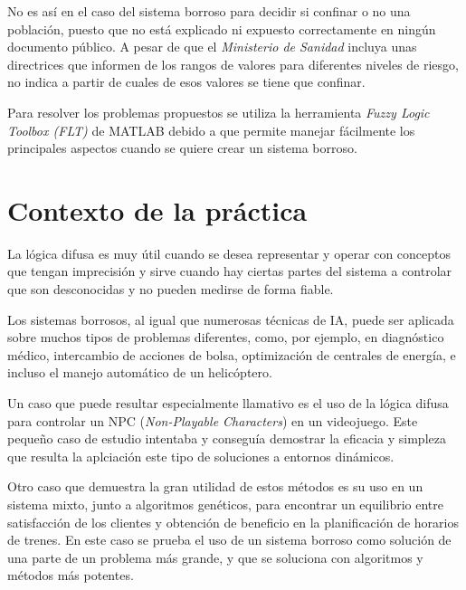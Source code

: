 \documentclass[12pt,a4paper, xcolor=table]{article}
\begin{document}
\vspace{2mm}

No es así en el caso del sistema borroso para decidir si confinar o no una población, puesto que no está explicado ni expuesto correctamente en ningún documento público. A pesar de que el \textit{Ministerio de Sanidad}\cite{poblacion} incluya unas directrices que informen de los rangos de valores para diferentes niveles de riesgo, no indica a partir de cuales de esos valores se tiene que confinar.

\vspace{4mm}

Para resolver los problemas propuestos se utiliza la herramienta \textit{Fuzzy Logic Toolbox (FLT)} de MATLAB debido a que permite manejar fácilmente los principales aspectos cuando se quiere crear un sistema borroso.

\newpage

\section{Contexto de la práctica}

La lógica difusa es muy útil cuando se desea representar y operar con conceptos que tengan imprecisión y sirve cuando hay ciertas partes del sistema a controlar que son desconocidas y no pueden medirse de forma fiable.

\vspace{3mm}

Los sistemas borrosos, al igual que numerosas técnicas de IA, puede ser aplicada sobre muchos tipos de problemas diferentes, como, por ejemplo, en diagnóstico médico, intercambio de acciones de bolsa, optimización de centrales de energía, e incluso el manejo automático de un helicóptero\cite{fuzzy}.

\vspace{2mm}

Un caso que puede resultar especialmente llamativo es el uso de la lógica difusa para controlar un NPC (\textit{Non-Playable Characters}) en un videojuego\cite{fuzzygame}. Este pequeño caso de estudio intentaba y conseguía demostrar la eficacia y simpleza que resulta la aplciación este tipo de soluciones a entornos dinámicos.

\vspace{3mm}

Otro caso que demuestra la gran utilidad de estos métodos es su uso en un sistema mixto, junto a algoritmos genéticos, para encontrar un equilibrio entre satisfacción de los clientes y obtención de beneficio en la planificación de horarios de trenes\cite{fuzzytrain}. En este caso se prueba el uso de un sistema borroso como solución de una parte de un problema más grande, y que se soluciona con algoritmos y métodos más potentes.
\end{document}
